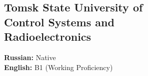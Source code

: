 \documentclass[a4paper]{MagicalCV}
\begin{document}
\begin{minipage}[t]{0.33\textwidth}

\subsection{Tomsk State University of \\ Control Systems and \\ Radioelectronics}
\vspace{\topsep} %
\sectionsep


\textbf{Russian:} Native \\
\textbf{English:} B1 (Working Proficiency)
\sectionsep

\end{minipage} 
\hfill
\end{document}

